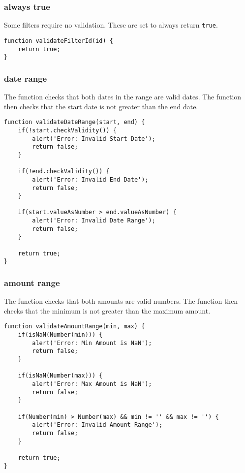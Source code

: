 \documentclass[letterpaper]{article}
\begin{document}
\subsubsection{always true}

Some filters require no validation.
These are set to always return \lstinline{true}.

\begin{lstlisting}[firstnumber=406]
function validateFilterId(id) {
    return true;
}
\end{lstlisting}

\subsubsection{date range}

The function checks that both dates in the range are valid dates.
The function then checks that the start date is not greater than the end date.

\begin{lstlisting}[firstnumber=410]
function validateDateRange(start, end) {
    if(!start.checkValidity()) {
        alert('Error: Invalid Start Date');
        return false;
    }

    if(!end.checkValidity()) {
        alert('Error: Invalid End Date');
        return false;
    }

    if(start.valueAsNumber > end.valueAsNumber) {
        alert('Error: Invalid Date Range');
        return false;
    }

    return true;
}
\end{lstlisting}

\subsubsection{amount range}

The function checks that both amounts are valid numbers.
The function then checks that the minimum is not greater than the maximum amount.

\begin{lstlisting}[firstnumber=437]
function validateAmountRange(min, max) {
    if(isNaN(Number(min))) {
        alert('Error: Min Amount is NaN');
        return false;
    }

    if(isNaN(Number(max))) {
        alert('Error: Max Amount is NaN');
        return false;
    }

    if(Number(min) > Number(max) && min != '' && max != '') {
        alert('Error: Invalid Amount Range');
        return false;
    }

    return true;
}
\end{lstlisting}
\end{document}
